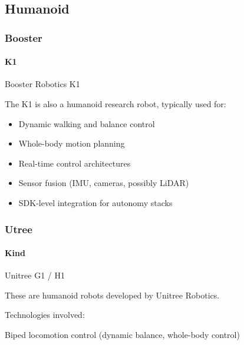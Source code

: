 \documentclass{book}
\begin{document}
\subsection{Humanoid}

\subsubsection{Booster}

\paragraph{K1}


Booster Robotics K1


    The K1 is also a humanoid research robot, typically used for:
    
    
    \begin{itemize}
    
        \item
        Dynamic walking and balance control
        
        
        
        
        \item
        Whole-body motion planning
        \item
        Real-time control architectures
        \item
        Sensor fusion (IMU, cameras, possibly LiDAR)
        \item
        SDK-level integration for autonomy stacks
    
    
    \end{itemize}

\subsubsection{Utree}

\paragraph{Kind}


Unitree G1 / H1

    These are humanoid robots developed by Unitree Robotics.
    
    Technologies involved:
    
    Biped locomotion control (dynamic balance, whole-body control)
    
\end{document}
